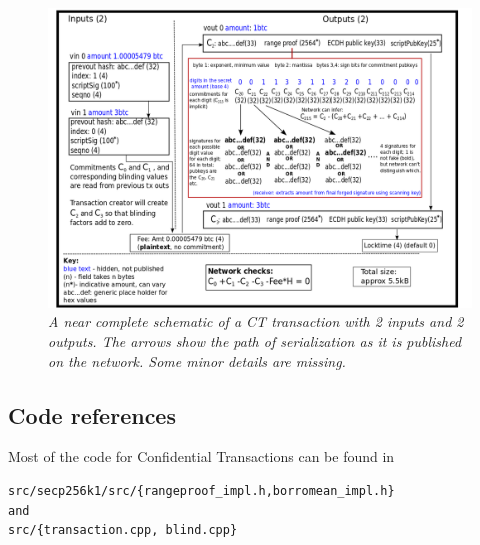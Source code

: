 \documentclass[10pt,a4paper]{article}
\begin{document}
\begin{figure}[h]
\raggedright
\includegraphics[scale=0.5]{transaction.png}
\caption{\emph{A near complete schematic of a CT transaction with 2 inputs and 2 outputs. The arrows show the path of serialization as it is published on the network. Some minor details are missing.}}
\end{figure}

\pagebreak

\subsection{Code references}
Most of the code for Confidential Transactions can be found in

\begin{verbatim}
src/secp256k1/src/{rangeproof_impl.h,borromean_impl.h}
and
src/{transaction.cpp, blind.cpp}
\end{verbatim}


\pagebreak
\end{document}
